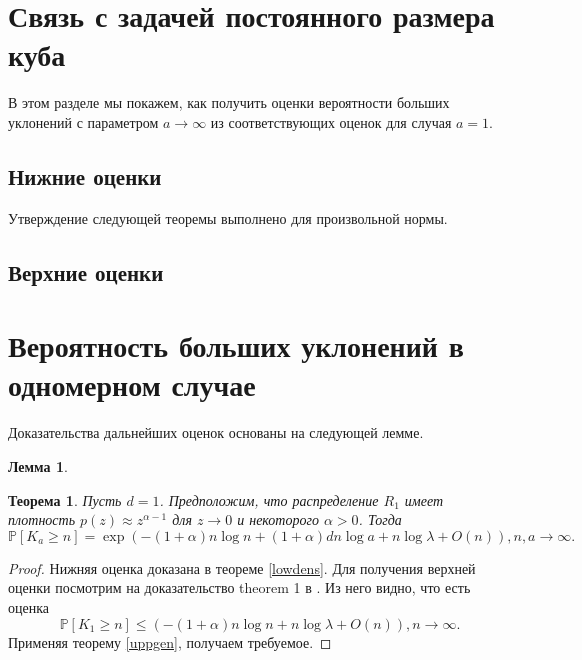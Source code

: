 \documentclass[12pt]{article}
\theoremstyle{plain}
\newtheorem{thm}{Теорема} %
\newtheorem{lm}{Лемма}
\theoremstyle{definition}
\theoremstyle{remark}
\def\geq{\geqslant}
\def\leq{\leqslant}
\newcommand{\PP}{\mathbb{P}}
\begin{document}
\section{Связь с задачей постоянного размера куба}

В этом разделе мы покажем, как получить оценки вероятности больших уклонений с параметром $a\to \infty$ из соответствующих оценок для случая  $a=1$. 

\subsection{Нижние оценки}
Утверждение следующей теоремы выполнено для произвольной нормы.


\subsection{Верхние оценки}


\section{Вероятность больших уклонений в одномерном случае}

Доказательства дальнейших оценок основаны на следующей лемме.

\begin{lm}

\end{lm}

\begin{thm}
Пусть $d=1$. Предположим, что распределение $R_1$ имеет плотность $p(z)\approx z^{\alpha-1}$ для $z\to 0$ и некоторого $\alpha > 0$. Тогда 
\begin{equation*}
    \PP[K_a\geq n] = \exp(-(1+\alpha)n\log n + (1+\alpha)dn\log a + n\log\lambda +O(n)), n,a \to\infty.
\end{equation*}
\end{thm}

\begin{proof}
Нижняя оценка доказана в теореме \ref{lowdens}. Для получения верхней оценки посмотрим на доказательство theorem 1 в \cite{AL}. Из него видно, что есть оценка
\begin{equation*}
    \PP[K_1 \geq n] \leq (-(1+\alpha)n\log n + n\log\lambda + O(n)), n\to\infty.
\end{equation*}
Применяя теорему \ref{uppgen}, получаем требуемое.
\end{proof}
\end{document}
